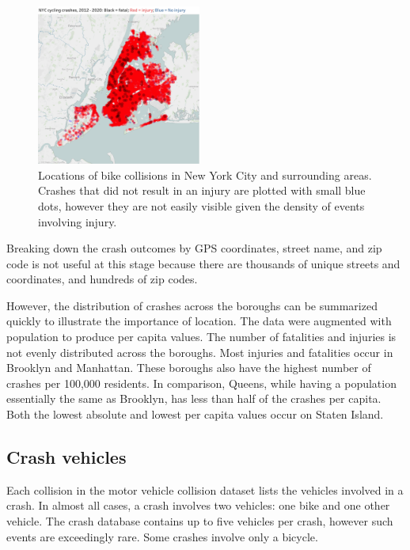 \documentclass[twocolumn,oneside]{article}
\begin{document}
\begin{figure}[h]
\centering
  \includegraphics[width=0.48\textwidth]{../figs/Outcome_map.png}
  \caption{Locations of bike collisions in New York City and
    surrounding areas.  Crashes that did not result in an injury are
    plotted with small blue dots, however they are not easily visible
    given the density of events involving injury.}
\label{fig:outcome_map}
\end{figure}

Breaking down the crash outcomes by GPS coordinates, street name, and
zip code is not useful at this stage because there are thousands of
unique streets and coordinates, and hundreds of zip codes.

However, the distribution of crashes across the boroughs can be
summarized quickly to illustrate the importance of location.  The data
were augmented with population to produce per capita values.  The
number of fatalities and injuries is not evenly distributed across the
boroughs.  Most injuries and fatalities occur in Brooklyn and
Manhattan.  These boroughs also have the highest number of crashes per
100,000 residents.  In comparison, Queens, while having a population
essentially the same as Brooklyn, has less than half of the crashes
per capita.  Both the lowest absolute and lowest per capita values
occur on Staten Island.

\subsection{Crash vehicles}

Each collision in the motor vehicle collision dataset lists the
vehicles involved in a crash.  In almost all cases, a crash involves
two vehicles: one bike and one other vehicle.  The crash database
contains up to five vehicles per crash, however such events are
exceedingly rare.  Some crashes involve only a bicycle.
\end{document}
